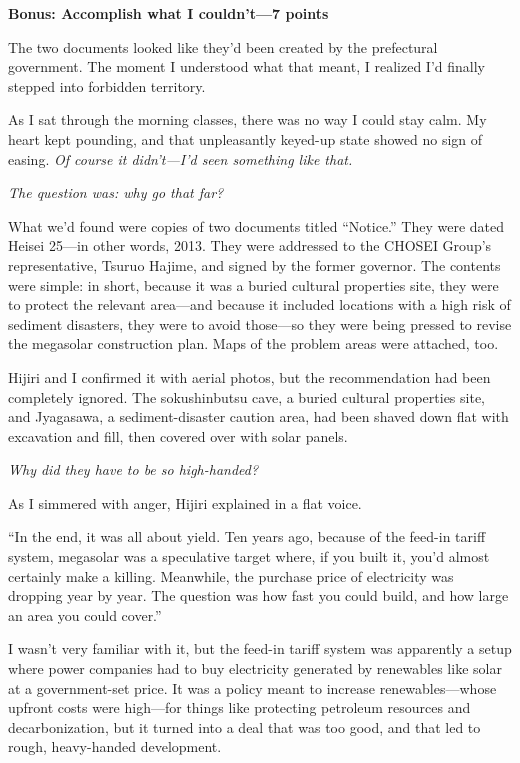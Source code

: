 \documentclass[
    a4paper,
    12pt,
    twoside,
    openany,
    UTF8,
    fontset=windows
]{ctexbook}
\begin{document}
\textbf{Bonus: Accomplish what I couldn't---7 points}

The two documents looked like they'd been created by the prefectural government.
The moment I understood what that meant, I realized I'd finally stepped into forbidden territory.

As I sat through the morning classes, there was no way I could stay calm. My heart kept pounding, and that unpleasantly keyed-up state showed no sign of easing. \textit{Of course it didn't---I'd seen something like that.}

\textit{The question was: why go that far?}

What we'd found were copies of two documents titled ``Notice.'' They were dated Heisei 25---in other words, 2013. They were addressed to the CHOSEI Group's representative, Tsuruo Hajime, and signed by the former governor. The contents were simple: in short, because it was a buried cultural properties site, they were to protect the relevant area---and because it included locations with a high risk of sediment disasters, they were to avoid those---so they were being pressed to revise the megasolar construction plan. Maps of the problem areas were attached, too.

Hijiri and I confirmed it with aerial photos, but the recommendation had been completely ignored. The sokushinbutsu cave, a buried cultural properties site, and Jyagasawa, a sediment-disaster caution area, had been shaved down flat with excavation and fill, then covered over with solar panels.

\textit{Why did they have to be so high-handed?}

As I simmered with anger, Hijiri explained in a flat voice.

``In the end, it was all about yield. Ten years ago, because of the feed-in tariff system, megasolar was a speculative target where, if you built it, you'd almost certainly make a killing. Meanwhile, the purchase price of electricity was dropping year by year. The question was how fast you could build, and how large an area you could cover.''

I wasn't very familiar with it, but the feed-in tariff system was apparently a setup where power companies had to buy electricity generated by renewables like solar at a government-set price. It was a policy meant to increase renewables---whose upfront costs were high---for things like protecting petroleum resources and decarbonization, but it turned into a deal that was too good, and that led to rough, heavy-handed development.
\end{document}
